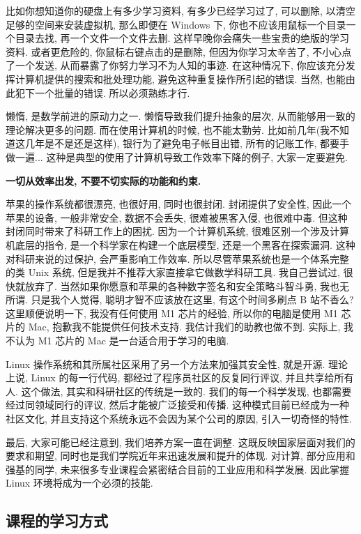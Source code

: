 \documentclass[a4paper]{ctexart}
\begin{document}
比如你想知道你的硬盘上有多少学习资料, 有多少已经学习过了, 可以删除, 以清空足够的空间来安装虚拟机,
那么即便在 Windows 下, 你也不应该用鼠标一个目录一个目录去找, 再一个文件一个文件去删.
这样早晚你会痛失一些宝贵的绝版的学习资料. 或者更危险的, 你鼠标右键点击的是删除, 但因为你学习太辛苦了,
不小心点了一个发送, 从而暴露了你努力学习不为人知的事迹. 在这种情况下, 你应该充分发挥计算机提供的搜索和批处理功能,
避免这种重复操作所引起的错误. 当然, 也能由此犯下一个批量的错误. 所以必须熟练才行.

懒惰, 是数学前进的原动力之一. 懒惰导致我们提升抽象的层次, 从而能够用一致的理论解决更多的问题. 而在使用计算机的时候,
也不能太勤劳. 比如前几年(我不知道这几年是不是还是这样), 银行为了避免电子帐目出错, 所有的记账工作, 都要手做一遍...
这种是典型的使用了计算机导致工作效率下降的例子, 大家一定要避免.

{\bf 一切从效率出发, 不要不切实际的功能和约束.}

苹果的操作系统都很漂亮, 也很好用, 同时也很封闭. 封闭提供了安全性, 因此一个苹果的设备, 一般非常安全, 数据不会丢失,
很难被黑客入侵, 也很难中毒. 但这种封闭同时带来了科研工作上的困扰. 因为一个计算机系统,
很难区别一个涉及计算机底层的指令, 是一个科学家在构建一个底层模型, 还是一个黑客在探索漏洞.
这种对科研来说的过保护, 会严重影响工作效率. 所以尽管苹果系统也是一个体系完整的类 Unix 系统,
但是我并不推荐大家直接拿它做数学科研工具. 我自己尝试过, 很快就放弃了.
当然如果你愿意和苹果的各种数字签名和安全策略斗智斗勇, 我也无所谓. 只是我个人觉得, 聪明才智不应该放在这里,
有这个时间多刷点 B 站不香么? 这里顺便说明一下,
我没有任何使用 M1 芯片的经验, 所以你的电脑是使用 M1 芯片的 Mac, 抱歉我不能提供任何技术支持.
我估计我们的助教也做不到. 实际上, 我不认为 M1 芯片的 Mac 是一台适合用于学习的电脑. 

Linux 操作系统和其所属社区采用了另一个方法来加强其安全性, 就是开源. 理论上说, Linux 的每一行代码,
都经过了程序员社区的反复同行评议, 并且共享给所有人. 这个做法, 其实和科研社区的传统是一致的.
我们的每一个科学发现, 也都需要经过同领域同行的评议, 然后才能被广泛接受和传播. 这种模式目前已经成为一种社区文化,
并且支持这个系统永远不会因为某个公司的原因, 引入一切奇怪的特性.

最后, 大家可能已经注意到, 我们培养方案一直在调整. 这既反映国家层面对我们的要求和期望,
同时也是我们学院近年来迅速发展和提升的体现. 对计算, 部分应用和强基的同学,
未来很多专业课程会紧密结合目前的工业应用和科学发展. 因此掌握 Linux 环境将成为一个必须的技能.

\subsection{课程的学习方式}
\end{document}
